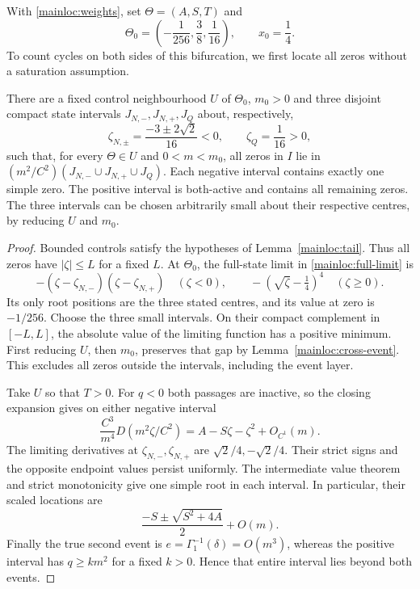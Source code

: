 With \eqref{mainloc:weights}, set $\Theta=(A,S,T)$ and
\begin{equation}\label{quartic:centre}
 \Theta_0=\left(-\frac1{256},\frac38,\frac1{16}\right),\qquad
 x_0=\frac14.
\end{equation}
To count cycles on both sides of this bifurcation, we first locate
all zeros without a saturation assumption.

\begin{lemma}
\label{mainloc:all-roots}
There are a fixed control neighbourhood $U$ of $\Theta_0$, $m_0>0$
and three disjoint compact state intervals $J_{N,-},J_{N,+},J_Q$
about, respectively,
\[
 \zeta_{N,\pm}=\frac{-3\pm2\sqrt2}{16}<0,\qquad
 \zeta_Q=\frac1{16}>0,
\]
such that, for every $\Theta\in U$ and $0<m<m_0$, all zeros in
$I$ lie in $(m^2/C^2)(J_{N,-}\cup J_{N,+}\cup J_Q)$.
Each negative interval contains exactly one simple zero. The positive
interval is both-active and contains all remaining zeros.
The three intervals can be chosen arbitrarily small about their
respective centres, by reducing $U$ and $m_0$.
\end{lemma}

\begin{proof}
Bounded controls satisfy the hypotheses of Lemma~\ref{mainloc:tail}.
Thus all zeros have $|\zeta|\le L$ for a fixed $L$.
At $\Theta_0$, the full-state limit in
\eqref{mainloc:full-limit} is
\[
 -\left(\zeta-\zeta_{N,-}\right)
       \left(\zeta-\zeta_{N,+}\right)\quad(\zeta<0),\qquad
 -\left(\sqrt\zeta-\tfrac14\right)^4\quad(\zeta\ge0).
\]
Its only root positions are the three stated centres, and its value
at zero is $-1/256$. Choose the three small intervals. On their
compact complement in $[-L,L]$, the absolute value of the limiting
function has a positive minimum. First reducing $U$, then $m_0$,
preserves that gap by Lemma~\ref{mainloc:cross-event}. This excludes
all zeros outside the intervals, including the event layer.

Take $U$ so that $T>0$. For $q<0$ both passages are inactive, so
the closing expansion gives on either negative interval
\[
 \frac{C^3}{m^4}D(m^2\zeta/C^2)
 =A-S\zeta-\zeta^2+O_{C^1}(m).
\]
The limiting derivatives at $\zeta_{N,-},\zeta_{N,+}$ are
$\sqrt2/4,-\sqrt2/4$. Their strict signs and the opposite endpoint
values persist uniformly. The intermediate value theorem and strict
monotonicity give one simple root in each interval. In particular,
their scaled locations are
\[
 \frac{-S\pm\sqrt{S^2+4A}}2+O(m).
\]
Finally the true second event is
$e=\Gamma_1^{-1}(\delta)=O(m^3)$, whereas the positive interval
has $q\ge k m^2$ for a fixed $k>0$. Hence that entire interval
lies beyond both events.
\end{proof}

